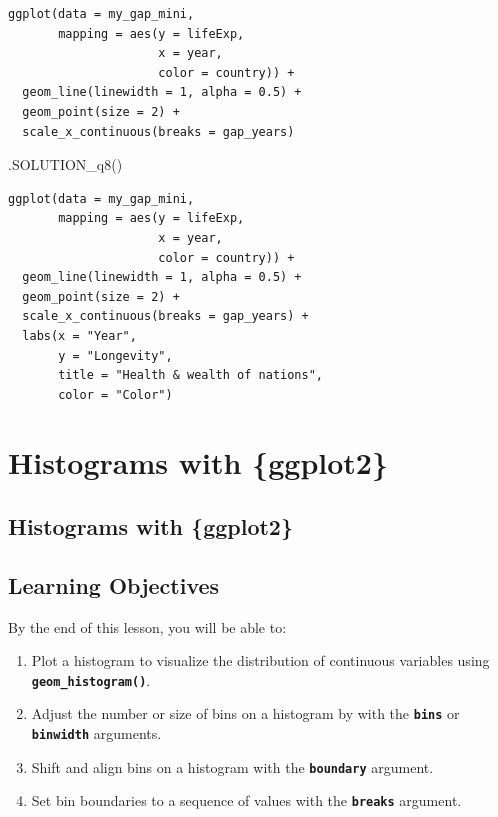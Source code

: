 \documentclass[
  letterpaper,
  DIV=11,
  numbers=noendperiod]{scrreprt}
\newenvironment{Shaded}{\begin{snugshade}}{\end{snugshade}}
\newcommand{\FunctionTok}[1]{\textcolor[rgb]{0.28,0.35,0.67}{#1}}
\newcommand{\NormalTok}[1]{\textcolor[rgb]{0.00,0.23,0.31}{#1}}
\providecommand{\tightlist}{%
  \setlength{\itemsep}{0pt}\setlength{\parskip}{0pt}}\usepackage{longtable,booktabs,array}
\begin{document}
\begin{verbatim}
ggplot(data = my_gap_mini, 
       mapping = aes(y = lifeExp, 
                     x = year, 
                     color = country)) +
  geom_line(linewidth = 1, alpha = 0.5) +
  geom_point(size = 2) +
  scale_x_continuous(breaks = gap_years)
\end{verbatim}

\begin{Shaded}
\begin{Highlighting}[]
\FunctionTok{.SOLUTION\_q8}\NormalTok{()}
\end{Highlighting}
\end{Shaded}

\begin{verbatim}
ggplot(data = my_gap_mini, 
       mapping = aes(y = lifeExp, 
                     x = year, 
                     color = country)) +
  geom_line(linewidth = 1, alpha = 0.5) +
  geom_point(size = 2) +
  scale_x_continuous(breaks = gap_years) +
  labs(x = "Year", 
       y = "Longevity",
       title = "Health & wealth of nations",
       color = "Color")
\end{verbatim}

\chapter{Histograms with \{ggplot2\}}\label{histograms-with-ggplot2}

\section{Histograms with \{ggplot2\}}\label{histograms-with-ggplot2-1}

\section{Learning Objectives}\label{learning-objectives-17}

By the end of this lesson, you will be able to:

\begin{enumerate}
\def\labelenumi{\arabic{enumi}.}
\tightlist
\item
  Plot a histogram to visualize the distribution of continuous variables
  using \textbf{\texttt{geom\_histogram()}}.
\item
  Adjust the number or size of bins on a histogram by with the
  \textbf{\texttt{bins}} or \textbf{\texttt{binwidth}} arguments.
\item
  Shift and align bins on a histogram with the
  \textbf{\texttt{boundary}} argument.
\item
  Set bin boundaries to a sequence of values with the
  \textbf{\texttt{breaks}} argument.
\end{enumerate}
\end{document}
